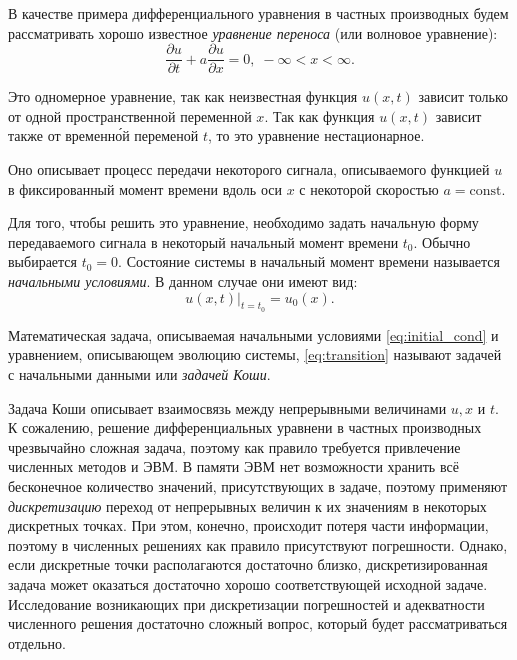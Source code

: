 

\Theory

В качестве примера дифференциального уравнения в частных производных
будем рассматривать хорошо известное \emph{уравнение переноса} (или
волновое уравнение):
\begin{equation}
\frac{\partial u}
{\partial t}+a\frac{\partial u}{\partial x}=0,\;-\infty<x<\infty.
\label{eq:transition}
\end{equation}


Это одномерное уравнение, так как неизвестная функция $u(x,t)$ зависит
только от одной пространственной переменной $x$. Так как функция
$u(x,t)$ зависит также от временн\'{о}й переменой $t$, то это уравнение
нестационарное.

Оно описывает процесс передачи некоторого сигнала, описываемого функцией
$u$ в фиксированный момент времени вдоль оси $x$ с некоторой скоростью
$a=\mathrm{const}$.

Для того, чтобы решить это уравнение, необходимо задать начальную
форму передаваемого сигнала в некоторый начальный момент времени $t_{0}$.
Обычно выбирается $t_{0}=0.$ Состояние системы в начальный момент
времени называется \emph{начальными условиями}. В данном случае они
имеют вид:
\begin{equation}
u(x,t)|_{t=t_{0}}=u_{0}(x).\label{eq:initial_cond}
\end{equation}


Математическая задача, описываемая начальными условиями \eqref{eq:initial_cond}
и уравнением, описывающем эволюцию системы, \eqref{eq:transition}
называют задачей с начальными данными или \emph{задачей Коши}.

Задача Коши описывает взаимосвязь между непрерывными величинами $u,$$x$
и $t$. К сожалению, решение дифференциальных уравнени в частных производных
чрезвычайно сложная задача, поэтому как правило требуется привлечение
численных методов и ЭВМ. В памяти ЭВМ нет возможности хранить всё
бесконечное количество значений, присутствующих в задаче, поэтому
применяют \emph{дискретизацию} \textemdash{} переход от непрерывных
величин к их значениям в некоторых дискретных точках. При этом, конечно,
происходит потеря части информации, поэтому в численных решениях как
правило присутствуют погрешности. Однако, если дискретные точки располагаются
достаточно близко, дискретизированная задача может оказаться достаточно
хорошо соответствующей исходной задаче. Исследование возникающих при
дискретизации погрешностей и адекватности численного решения \textemdash{}
достаточно сложный вопрос, который будет рассматриваться отдельно.

